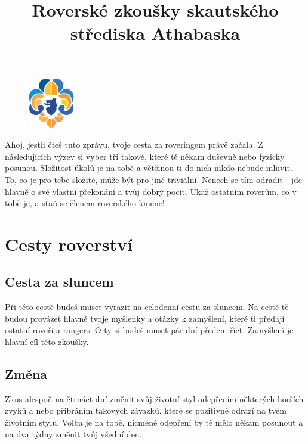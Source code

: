 \documentclass[11pt, fleqn]{article}
\title{Roverské zkoušky skautského střediska Athabaska}
\author{}
\date{}
\begin{document}
\maketitle{}
\vspace{-20pt}

\begin{figure}
  \vspace{-30pt}
  \begin{center}
    \includegraphics[width=0.18\textwidth]{logo.png}
  \end{center}
  \vspace{-20pt}
\end{figure}

Ahoj, jestli čteš tuto zprávu, tvoje cesta za roveringem právě začala.
Z následujících výzev si vyber tři takové, které tě někam duševně nebo fyzicky posunou. Složitost úkolů je na tobě a většinou ti do nich nikdo nebude mluvit. To, co je pro tebe složité, může být pro jiné triviální. Nenech se tím odradit - jde hlavně o své vlastní překonání a tvůj dobrý pocit. Ukaž ostatním roverům, co v tobě je, a staň se členem roverského kmene!

\vspace{20pt}
\section*{Cesty roverství}
  \subsection*{Cesta za sluncem}
  Při této cestě budeš muset vyrazit na celodenní cestu za sluncem. Na cestě tě budou provázet hlavně tvoje myšlenky a otázky k zamyšlení, které ti předají ostatní roveři a rangers. O ty si budeš muset pár dní předem říct. Zamyšlení je hlavní cíl této zkoušky.
  \subsection*{Změna}
  Zkus alespoň na čtrnáct dní změnit svůj životní styl odepřením některých horších zvyků a nebo přibráním takových závazků, které se pozitivně odrazí na tvém životním stylu. Volba je na tobě, nicméně odepření by tě mělo někam posunout a na dva týdny změnit tvůj všední den.
\end{document}
